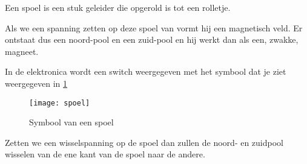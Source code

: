 Een spoel is een stuk geleider die opgerold is tot een rolletje.

Als we een spanning zetten op deze spoel van vormt hij een magnetisch veld. Er ontstaat dus een noord-pool en een zuid-pool en hij werkt dan als een, zwakke, magneet.

In de elektronica wordt een switch weergegeven met het symbool dat je ziet weergegeven in \ref{symbool:spoel}

\begin{figure}[h]
\texttt{[image: spoel]}
\centering
\caption{Symbool van een spoel}
\label{symbool:spoel}
\end{figure}

Zetten we een wisselspanning op de spoel dan zullen de noord- en zuidpool wisselen van de ene kant van de spoel naar de andere.

